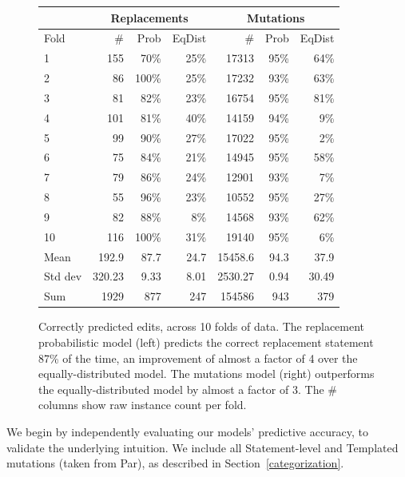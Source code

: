 \documentclass[conference]{IEEEtran}
\begin{document}
\begin{figure}[ht]
{\footnotesize
{\centering
\begin{tabular}{l|rrr|rrr}
\toprule
   &\multicolumn{3}{c|}{Replacements} &\multicolumn{3}{c}{Mutations} \\
\midrule
Fold	& \# &Prob& EqDist& \#&Prob& EqDist \\
\midrule
1	& 155&70\%&	25\% &17313&  95\% & 64\%   \\
2	& 86&100\%&	25\%  & 17232& 93\% & 63\%   \\
3	& 81&82\%	&23\%  & 16754& 95\% & 81\% \\
4	& 101&81\%	&40\%  & 14159& 94\% & 9\%   \\
5	& 99&90\%	&27\%  & 17022& 95\% & 2\%  \\
6	& 75&84\%	&21\%  & 14945& 95\%& 58\%  \\
7	& 79&86\%	&24\%  & 12901& 93\%& 7\%  \\
8	& 55&96\%	&23\%  & 10552& 95\%& 27\%  \\
9	& 82&88\%	&8\%  & 14568& 93\%& 62\% \\
10	& 116&100\%	&31\% & 19140 & 95\% & 6\% \\
\midrule
Mean	& 192.9 &87.7	&24.7& 15458.6  & 94.3 & 37.9  \\
\midrule
Std dev	& 320.23&9.33&	8.01 & 2530.27 & 0.94 & 30.49   \\
\midrule
Sum & 1929&877 & 247 &  154586& 943 & 379  \\
\bottomrule
\end{tabular}
\center
  \caption{Correctly predicted edits, across 10 folds of data.
The replacement probabilistic model (left) predicts
    the correct replacement statement 87\% of the time,
    an improvement of almost a factor of 4 over the equally-distributed model. 
    The mutations model (right) outperforms the equally-distributed model by 
    almost a factor of 3. The \# columns show raw instance count per fold. \label{results10fcv}} 
}}
\end{figure} 


We begin by independently evaluating our models' predictive accuracy, to
validate the underlying intuition.  We include all Statement-level and Templated
mutations (taken from Par), as described in Section~\ref{categorization}.
\end{document}
